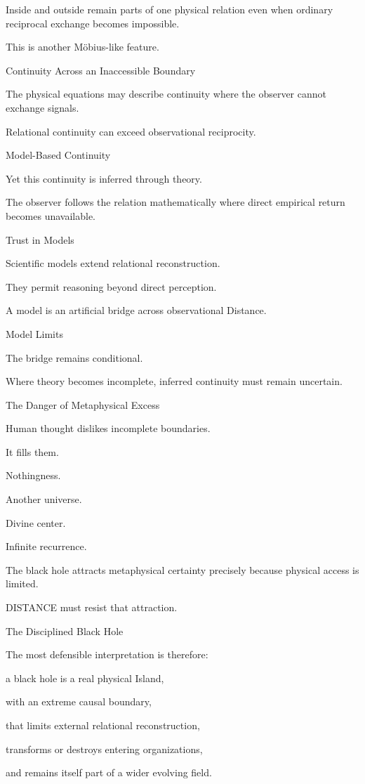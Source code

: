 Inside and outside remain parts of one physical relation even when ordinary reciprocal exchange becomes impossible.

This is another Möbius-like feature.

Continuity Across an Inaccessible Boundary

The physical equations may describe continuity where the observer cannot exchange signals.

Relational continuity can exceed observational reciprocity.

Model-Based Continuity

Yet this continuity is inferred through theory.

The observer follows the relation mathematically where direct empirical return becomes unavailable.

Trust in Models

Scientific models extend relational reconstruction.

They permit reasoning beyond direct perception.

A model is an artificial bridge across observational Distance.

Model Limits

The bridge remains conditional.

Where theory becomes incomplete, inferred continuity must remain uncertain.

The Danger of Metaphysical Excess

Human thought dislikes incomplete boundaries.

It fills them.

Nothingness.

Another universe.

Divine center.

Infinite recurrence.

The black hole attracts metaphysical certainty precisely because physical access is limited.

DISTANCE must resist that attraction.

The Disciplined Black Hole

The most defensible interpretation is therefore:

a black hole is a real physical Island,

with an extreme causal boundary,

that limits external relational reconstruction,

transforms or destroys entering organizations,

and remains itself part of a wider evolving field.

